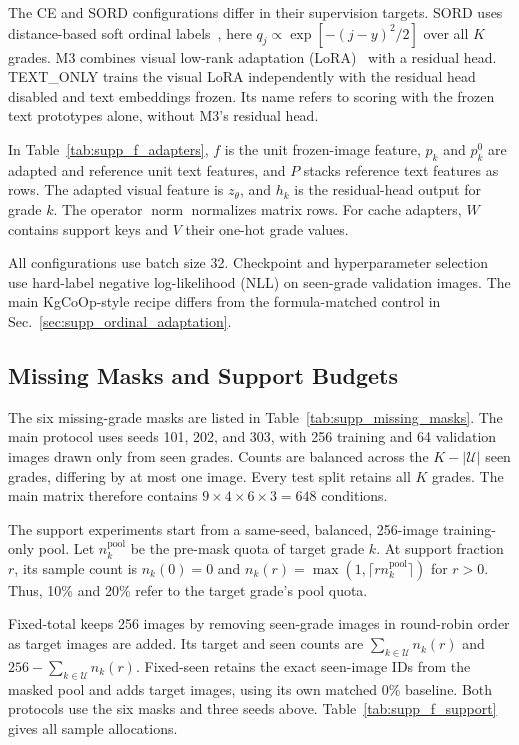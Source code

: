 The CE and SORD configurations differ in their supervision targets.
SORD uses distance-based soft ordinal labels~\cite{diaz2019sord}, here
$q_j\propto\exp[-(j-y)^2/2]$ over all $K$ grades.
M3 combines visual low-rank adaptation (LoRA)~\cite{hu2022lora} with a residual head.
TEXT\_ONLY trains the visual LoRA independently with the residual head disabled and text embeddings frozen.
Its name refers to scoring with the frozen text prototypes alone, without M3's residual head.

In Table~\ref{tab:supp_f_adapters}, $f$ is the unit frozen-image feature, $p_k$ and $p_k^0$ are adapted and reference unit text features, and $P$ stacks reference text features as rows.
The adapted visual feature is $z_\theta$, and $h_k$ is the residual-head output for grade $k$.
The operator $\operatorname{norm}$ normalizes matrix rows.
For cache adapters, $W$ contains support keys and $V$ their one-hot grade values.

All configurations use batch size 32.
Checkpoint and hyperparameter selection use hard-label negative log-likelihood (NLL) on seen-grade validation images.
The main KgCoOp-style recipe differs from the formula-matched control in Sec.~\ref{sec:supp_ordinal_adaptation}.


\subsection{Missing Masks and Support Budgets}
\label{sec:supp_f_masks}

The six missing-grade masks are listed in Table~\ref{tab:supp_missing_masks}.
The main protocol uses seeds 101, 202, and 303, with 256 training and 64 validation images drawn only from seen grades.
Counts are balanced across the $K-|\mathcal U|$ seen grades, differing by at most one image.
Every test split retains all $K$ grades.
The main matrix therefore contains $9\times4\times6\times3=648$ conditions.

The support experiments start from a same-seed, balanced, 256-image training-only pool.
Let $n_k^{\mathrm{pool}}$ be the pre-mask quota of target grade $k$.
At support fraction $r$, its sample count is
$n_k(0)=0$ and
$n_k(r)=\max(1,\lceil r n_k^{\mathrm{pool}}\rceil)$ for $r>0$.
Thus, 10\% and 20\% refer to the target grade's pool quota.

Fixed-total keeps 256 images by removing seen-grade images in round-robin order as target images are added.
Its target and seen counts are
$\sum_{k\in\mathcal U}n_k(r)$ and
$256-\sum_{k\in\mathcal U}n_k(r)$.
Fixed-seen retains the exact seen-image IDs from the masked pool and adds target images, using its own matched 0\% baseline.
Both protocols use the six masks and three seeds above.
Table~\ref{tab:supp_f_support} gives all sample allocations.


